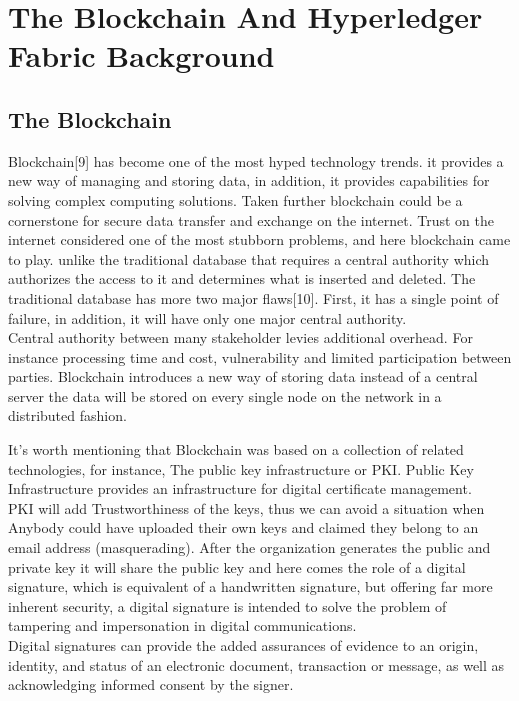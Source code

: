 \chapter{The Blockchain And Hyperledger Fabric Background}


\section{The Blockchain} 

Blockchain[9] has become one of the most hyped technology trends. it provides a new way of managing and storing data, in addition, it provides capabilities for solving complex computing solutions. Taken further blockchain could be a cornerstone for secure data transfer and exchange on the internet.
Trust on the internet considered one of the most stubborn problems, and here blockchain came to play. unlike the traditional database that requires a central authority which authorizes the access to it and determines what is inserted and deleted. The traditional database has more two major flaws[10]. 
First, it has a single point of failure, in addition, it will have only one major central authority.\\
Central authority between many stakeholder levies additional overhead. For instance processing time and cost, vulnerability and limited participation between parties.  
Blockchain introduces a new way of storing data instead of a central server the data will be stored on every single node on the network in a distributed fashion. 

It's worth mentioning that Blockchain was based on a collection of related technologies, for instance, The public key infrastructure or PKI.
Public Key Infrastructure provides an infrastructure for digital certificate management. \\ 
PKI will add Trustworthiness of the keys, thus we can avoid a situation when Anybody could have uploaded their own keys and claimed they belong
to an email address (masquerading). After the organization generates the public and private key it will share the public key and here comes the role of a digital signature, which is equivalent of
a handwritten signature, but offering far more inherent security, a digital signature is intended to solve the problem of tampering and impersonation in digital communications. \\
Digital signatures can provide the added assurances of evidence to an origin, identity, and status of an electronic document,
transaction or message, as well as acknowledging informed consent by the signer. \\



